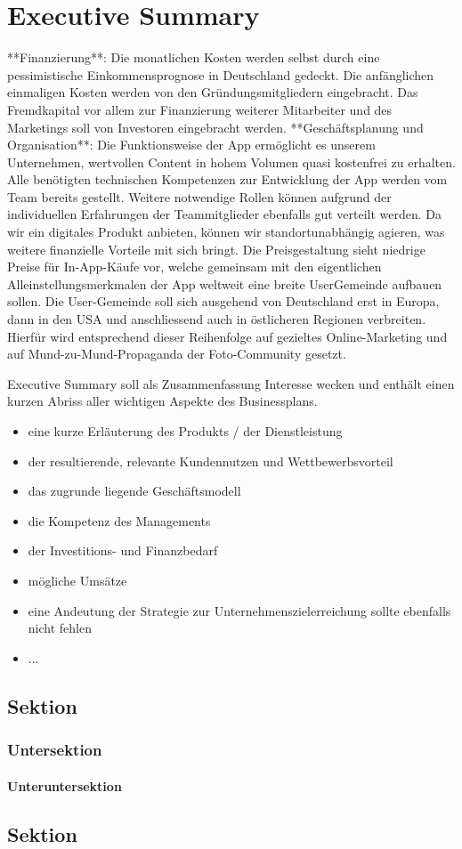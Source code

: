 \chapter{Executive Summary}



**Finanzierung**: Die monatlichen Kosten werden selbst durch eine pessimistische Einkommensprognose in Deutschland gedeckt. Die anfänglichen einmaligen Kosten werden von den Gründungsmitgliedern eingebracht. Das Fremdkapital vor allem zur Finanzierung weiterer Mitarbeiter und des Marketings soll von Investoren eingebracht werden.
**Geschäftsplanung und Organisation**: Die Funktionsweise der App ermöglicht es unserem Unternehmen, wertvollen Content in hohem Volumen quasi kostenfrei zu erhalten. Alle benötigten technischen Kompetenzen zur Entwicklung der App werden vom Team bereits gestellt. Weitere notwendige Rollen können aufgrund der individuellen Erfahrungen der Teammitglieder ebenfalls gut verteilt werden. Da wir ein digitales Produkt anbieten, können wir standortunabhängig agieren, was weitere finanzielle Vorteile mit sich bringt.
Die Preisgestaltung sieht niedrige Preise für In-App-Käufe vor, welche gemeinsam mit den eigentlichen Alleinstellungsmerkmalen der App weltweit eine breite UserGemeinde aufbauen sollen. Die User-Gemeinde soll sich ausgehend von Deutschland erst in Europa, dann in den USA und anschliessend auch in östlicheren Regionen verbreiten. Hierfür wird entsprechend dieser Reihenfolge auf gezieltes Online-Marketing und auf Mund-zu-Mund-Propaganda der Foto-Community gesetzt.



Executive Summary soll als Zusammenfassung Interesse wecken und enthält einen kurzen Abriss aller wichtigen Aspekte des Businessplans.
\begin{itemize}
\item eine kurze Erläuterung des Produkts / der Dienstleistung
\item der resultierende, relevante Kundennutzen und Wettbewerbsvorteil
\item das zugrunde liegende Geschäftsmodell
\item die Kompetenz des Managements
\item der Investitions- und Finanzbedarf
\item mögliche Umsätze
\item eine Andeutung der Strategie zur Unternehmenszielerreichung sollte ebenfalls nicht fehlen
\item ...
\end{itemize}

\section{Sektion}

\subsection{Untersektion}

\subsubsection{Unteruntersektion}

\section{Sektion}

